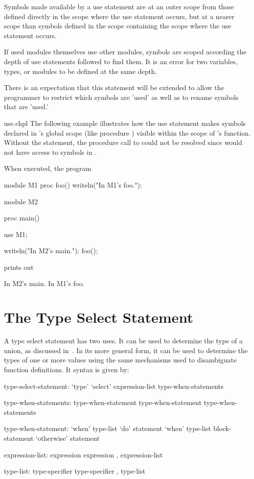 Symbols made available by a use statement are at an outer scope from those
defined directly in the scope where the use statement occurs, but at a
nearer scope than symbols defined in the scope containing the scope where
the use statement occurs.

If used modules themselves use other modules, symbols are scoped according
the depth of use statements followed to find them. It is an error for two
variables, types, or modules to be defined at the same depth.

\begin{openissue}
There is an expectation that this statement will be extended to allow
the programmer to restrict which symbols are 'used' as well as to
rename symbols that are 'used.'
\end{openissue}

\begin{chapelexample}{use.chpl}
  The following example illustrates how the use statement makes
  symbols declared in 's global scope (like procedure
  ) visible within the scope of 's 
  function.  Without the  statement, the procedure call to
   could not be resolved since  would not have
  access to symbols in .

  When executed, the program
\begin{chapel}
module M1 {
  proc foo() {
    writeln("In M1's foo.");
  }
}

module M2 {
  proc main() {
    use M1;

    writeln("In M2's main.");
    foo();
  }
}
\end{chapel}
prints out
\begin{chapelprintoutput}{}
In M2's main.
In M1's foo.
\end{chapelprintoutput}
\end{chapelexample}

\section{The Type Select Statement}
\label{The_Type_Select_Statement}

A type select statement has two uses.  It can be used to determine the
type of a union, as discussed
in~.  In its more general
form, it can be used to determine the types of one or more values
using the same mechanisms used to disambiguate function definitions.
It syntax is given by:
\begin{syntax}
type-select-statement:
  `type' `select' expression-list { type-when-statements }

type-when-statements:
  type-when-statement
  type-when-statement type-when-statements

type-when-statement:
  `when' type-list `do' statement
  `when' type-list block-statement
  `otherwise' statement

expression-list:
  expression
  expression , expression-list

type-list:
  type-specifier
  type-specifier , type-list
\end{syntax}

